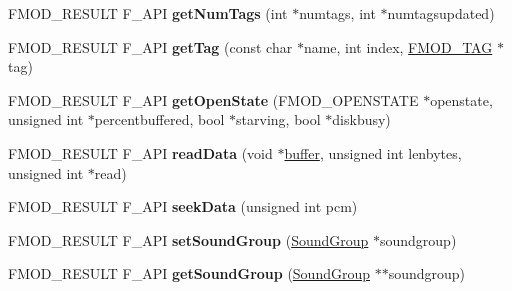 \begin{DoxyCompactItemize}
\item 
\hypertarget{class_f_m_o_d_1_1_sound_af676bc0be9a87128c8b09f104a4ce31c}{F\+M\+O\+D\+\_\+\+R\+E\+S\+U\+L\+T F\+\_\+\+A\+P\+I {\bfseries get\+Num\+Tags} (int $\ast$numtags, int $\ast$numtagsupdated)}\label{class_f_m_o_d_1_1_sound_af676bc0be9a87128c8b09f104a4ce31c}

\item 
\hypertarget{class_f_m_o_d_1_1_sound_abb0b254a45594e485e95ed4eab9fd1b3}{F\+M\+O\+D\+\_\+\+R\+E\+S\+U\+L\+T F\+\_\+\+A\+P\+I {\bfseries get\+Tag} (const char $\ast$name, int index, \hyperlink{struct_f_m_o_d___t_a_g}{F\+M\+O\+D\+\_\+\+T\+A\+G} $\ast$tag)}\label{class_f_m_o_d_1_1_sound_abb0b254a45594e485e95ed4eab9fd1b3}

\item 
\hypertarget{class_f_m_o_d_1_1_sound_a2c3115f9bd9343b7d3b09b2e4edbb8b3}{F\+M\+O\+D\+\_\+\+R\+E\+S\+U\+L\+T F\+\_\+\+A\+P\+I {\bfseries get\+Open\+State} (F\+M\+O\+D\+\_\+\+O\+P\+E\+N\+S\+T\+A\+T\+E $\ast$openstate, unsigned int $\ast$percentbuffered, bool $\ast$starving, bool $\ast$diskbusy)}\label{class_f_m_o_d_1_1_sound_a2c3115f9bd9343b7d3b09b2e4edbb8b3}

\item 
\hypertarget{class_f_m_o_d_1_1_sound_af58de66a892b9e49a513502288cf930b}{F\+M\+O\+D\+\_\+\+R\+E\+S\+U\+L\+T F\+\_\+\+A\+P\+I {\bfseries read\+Data} (void $\ast$\hyperlink{structbuffer}{buffer}, unsigned int lenbytes, unsigned int $\ast$read)}\label{class_f_m_o_d_1_1_sound_af58de66a892b9e49a513502288cf930b}

\item 
\hypertarget{class_f_m_o_d_1_1_sound_ac73572153744ba36367391939cd3bc5e}{F\+M\+O\+D\+\_\+\+R\+E\+S\+U\+L\+T F\+\_\+\+A\+P\+I {\bfseries seek\+Data} (unsigned int pcm)}\label{class_f_m_o_d_1_1_sound_ac73572153744ba36367391939cd3bc5e}

\item 
\hypertarget{class_f_m_o_d_1_1_sound_a6433c4494cbb472ef1d9cf214749dc01}{F\+M\+O\+D\+\_\+\+R\+E\+S\+U\+L\+T F\+\_\+\+A\+P\+I {\bfseries set\+Sound\+Group} (\hyperlink{class_f_m_o_d_1_1_sound_group}{Sound\+Group} $\ast$soundgroup)}\label{class_f_m_o_d_1_1_sound_a6433c4494cbb472ef1d9cf214749dc01}

\item 
\hypertarget{class_f_m_o_d_1_1_sound_a146bf9b59d99685b313f95e3460a4b8b}{F\+M\+O\+D\+\_\+\+R\+E\+S\+U\+L\+T F\+\_\+\+A\+P\+I {\bfseries get\+Sound\+Group} (\hyperlink{class_f_m_o_d_1_1_sound_group}{Sound\+Group} $\ast$$\ast$soundgroup)}\label{class_f_m_o_d_1_1_sound_a146bf9b59d99685b313f95e3460a4b8b}


\end{DoxyCompactItemize}
